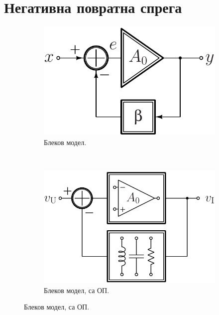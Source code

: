 \section{Негативна повратна спрега}
\begin{figure}[b!]
    \centering
    \begin{subfigure}[c]{0.32\textwidth}
    \centering
        \includegraphics[scale=0.5]
        {fig/black-model.pdf}
        \caption{Блеков модел.}
        \label{fig:black}
    \end{subfigure}
    ~ %
    \begin{subfigure}[c]{0.32\textwidth}
    \centering
        \includegraphics[scale=0.5]
        {fig/black-model-op.pdf}
        \caption{Блеков модел, са ОП.}
        \label{fig:op2}
    \end{subfigure}

\end{figure}
